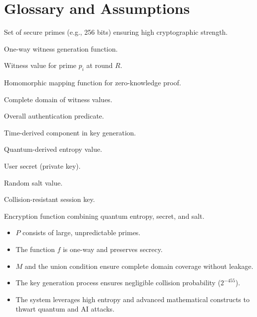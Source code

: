\documentclass[10pt,twocolumn]{article}
\begin{document}
\onecolumn

\section{Glossary and Assumptions}
\begin{description}[leftmargin=0.5cm, labelindent=0.5cm]
    \item[\(P\)] Set of secure primes (e.g., 256 bits) ensuring high cryptographic strength.
    \item[\(f(R,p)\)] One-way witness generation function.
    \item[\(x_i^R\)] Witness value for prime \(p_i\) at round \(R\).
    \item[\(M(p,x)\)] Homomorphic mapping function for zero-knowledge proof.
    \item[\(\mathcal{X}\)] Complete domain of witness values.
    \item[\(\Lambda\)] Overall authentication predicate.
    \item[\(T(t)\)] Time-derived component in key generation.
    \item[\(\lambda(t)\)] Quantum-derived entropy value.
    \item[\(S\)] User secret (private key).
    \item[\(r\)] Random salt value.
    \item[\(K(t,S,r)\)] Collision-resistant session key.
    \item[\(E(\lambda(t),S,r)\)] Encryption function combining quantum entropy, secret, and salt.
    \item[\textbf{Assumptions:}]
        \begin{itemize}[leftmargin=0.5cm]
            \item \(P\) consists of large, unpredictable primes.
            \item The function \(f\) is one-way and preserves secrecy.
            \item \(M\) and the union condition ensure complete domain coverage without leakage.
            \item The key generation process ensures negligible collision probability (\(2^{-455}\)).
            \item The system leverages high entropy and advanced mathematical constructs to thwart quantum and AI attacks.
        \end{itemize}
\end{description}
\end{document}

